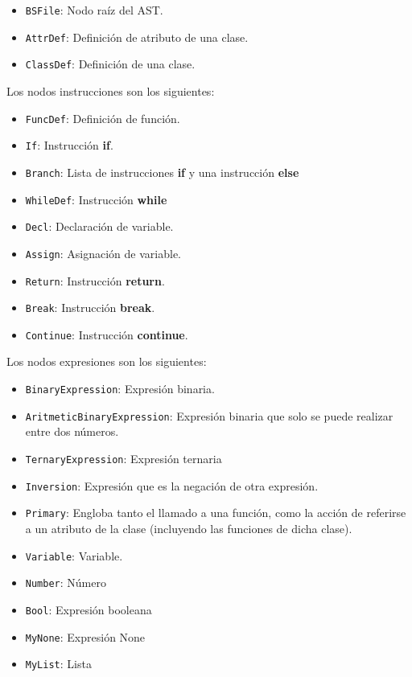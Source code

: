 \begin{itemize}
	\item \verb|BSFile|: Nodo ra\'iz del AST.
	\item \verb|AttrDef|: Definici\'on de atributo de una clase.  
	\item \verb|ClassDef|: Definici\'on de una clase.
\end{itemize}

Los nodos instrucciones son los siguientes:

\begin{itemize}
	\item \verb|FuncDef|: Definici\'on de funci\'on.
	\item \verb|If|: Instrucci\'on \textbf{if}. 
	\item \verb|Branch|: Lista de instrucciones \textbf{if} y una instrucci\'on \textbf{else}
	\item \verb|WhileDef|: Instrucci\'on \textbf{while}
	\item \verb|Decl|: Declaraci\'on de variable.
	\item \verb|Assign|: Asignaci\'on de variable. 
	\item \verb|Return|: Instrucci\'on \textbf{return}.
	\item \verb|Break|: Instrucci\'on \textbf{break}.
	\item \verb|Continue|: Instrucci\'on \textbf{continue}.
\end{itemize}

Los nodos expresiones son los siguientes:

\begin{itemize}
	\item \verb|BinaryExpression|: Expresi\'on binaria.
	\item \verb|AritmeticBinaryExpression|: Expresi\'on binaria que solo se puede realizar entre dos n\'umeros.
	\item \verb|TernaryExpression|: Expresi\'on ternaria
	\item \verb|Inversion|: Expresi\'on que es la negaci\'on de otra expresi\'on.
	\item \verb|Primary|: Engloba tanto el llamado a una funci\'on, como la acci\'on de referirse a un atributo de la clase (incluyendo las funciones de dicha clase).
	\item \verb|Variable|: Variable.
	\item \verb|Number|: N\'umero
	\item \verb|Bool|: Expresi\'on booleana
	\item \verb|MyNone|: Expresi\'on None
	\item \verb|MyList|: Lista
\end{itemize}


